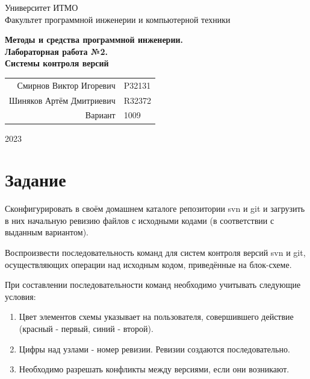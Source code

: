 \documentclass{article}
\begin{document}
\begin{titlepage}
  \begin{center}
    \begin{spacing}{1.4}
      \large{Университет ИТМО} \\
      \large{Факультет программной инженерии и компьютерной техники} \\
    \end{spacing}
    \vfill
    \textbf{
      \huge{Методы и средства программной инженерии.} \\
      \huge{Лабораторная работа №2.} \\
      \huge{Системы контроля версий} \\
    }
  \end{center}
  \vfill
  \begin{center}
    \begin{tabular}{r l}
      Смирнов Виктор Игоревич  & P32131 \\
      Шиняков Артём Дмитриевич & R32372 \\
      Вариант                  & 1009   \\
    \end{tabular}
  \end{center}
  \vfill
  \begin{center}
    \begin{large}
      2023
    \end{large}
  \end{center}
\end{titlepage}

\tableofcontents

\section{Задание}

Сконфигурировать в своём домашнем каталоге репозитории svn и git 
и загрузить в них начальную ревизию файлов с исходными кодами 
(в соответствии с выданным вариантом).

Воспроизвести последовательность команд для систем контроля версий 
svn и git, осуществляющих операции над исходным кодом, приведённые 
на блок-схеме.

При составлении последовательности команд необходимо учитывать 
следующие условия:
\begin{enumerate}
    \item Цвет элементов схемы указывает на пользователя, совершившего 
          действие (красный - первый, синий - второй).
    \item Цифры над узлами - номер ревизии. Ревизии создаются последовательно.
    \item Необходимо разрешать конфликты между версиями, если они возникают.
\end{enumerate}
\end{document}
